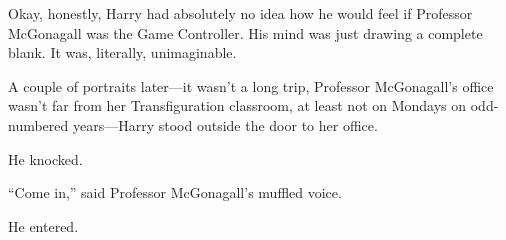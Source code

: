 Okay, honestly, Harry had absolutely no idea how he would feel if Professor McGonagall was the Game Controller. His mind was just drawing a complete blank. It was, literally, unimaginable.

A couple of portraits later—it wasn’t a long trip, Professor McGonagall’s office wasn’t far from her Transfiguration classroom, at least not on Mondays on odd-numbered years—Harry stood outside the door to her office.

He knocked.

“Come in,” said Professor McGonagall’s muffled voice.

He entered.

